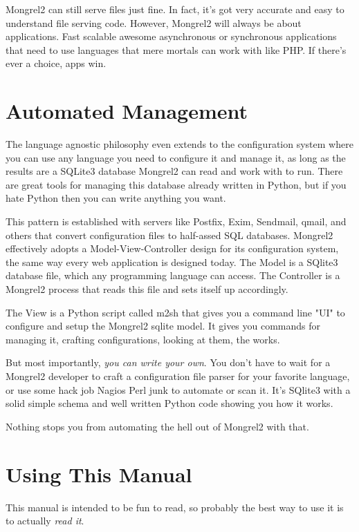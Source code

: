 Mongrel2 can still serve files just fine.  In fact, it's got very accurate and easy
to understand file serving code.  However, Mongrel2 will always be about applications.
Fast scalable awesome asynchronous or synchronous applications that need to use languages
that mere mortals can work with like PHP.  If there's ever a choice, apps win.

\section{Automated Management}

The language agnostic philosophy even extends to the configuration system where
you can use any language you need to configure it and manage it, as long as the
results are a SQLite3 database Mongrel2 can read and work with to run.  There are
great tools for managing this database already written in Python, but if you hate
Python then you can write anything you want.

This pattern is established with servers like Postfix, Exim, Sendmail, qmail,
and others that convert configuration files to half-assed SQL databases.
Mongrel2 effectively adopts a Model-View-Controller design for its
configuration system, the same way every web application is designed today.
The Model is a SQlite3 database file, which any programming language can access.
The Controller is a Mongrel2 process that reads this file and sets itself up
accordingly.

The View is a Python script called m2sh that gives you a command line "UI" to
configure and setup the Mongrel2 sqlite model.  It gives you commands for 
managing it, crafting configurations, looking at them, the works.

But most importantly, \emph{you can write your own}.  You don't have to wait
for a Mongrel2 developer to craft a configuration file parser for your favorite
language, or use some hack job Nagios Perl junk to automate or scan it.  It's
SQlite3 with a solid simple schema and well written Python code showing you how
it works.

Nothing stops you from automating the hell out of Mongrel2 with that.


\section{Using This Manual}

This manual is intended to be fun to read, so probably the best way to use it
is to actually \emph{read it}.

